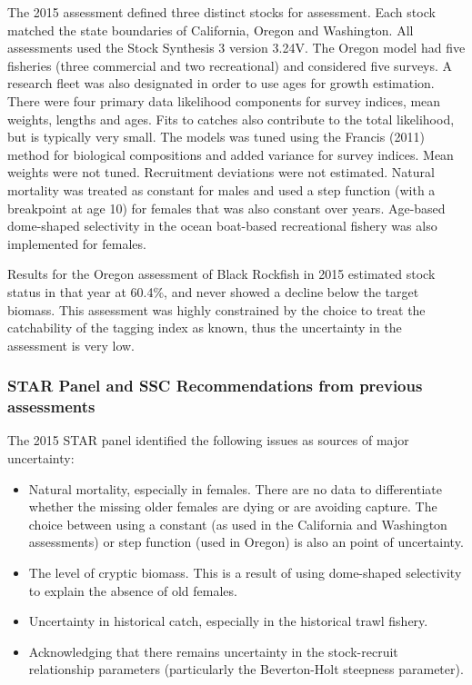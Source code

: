 \documentclass[11pt,
  letterpaper,
]{article}
\providecommand{\tightlist}{%
  \setlength{\itemsep}{0pt}\setlength{\parskip}{0pt}}
\providecommand{\tightlist}{%
  \setlength{\itemsep}{0pt}\setlength{\parskip}{0pt}}
\begin{document}
The 2015 assessment defined three distinct stocks for assessment. Each stock matched the state boundaries of California, Oregon and Washington. All assessments used the Stock Synthesis 3 version 3.24V. The Oregon model had five fisheries (three commercial and two recreational) and considered five surveys. A research fleet was also designated in order to use ages for growth estimation. There were four primary data likelihood components for survey indices, mean weights, lengths and ages. Fits to catches also contribute to the total likelihood, but is typically very small. The models was tuned using the Francis (2011) method for biological compositions and added variance for survey indices. Mean weights were not tuned. Recruitment deviations were not estimated. Natural mortality was treated as constant for males and used a step function (with a breakpoint at age 10) for females that was also constant over years. Age-based dome-shaped selectivity in the ocean boat-based recreational fishery was also implemented for females.

Results for the Oregon assessment of Black Rockfish in 2015 estimated stock status in that year at 60.4\%, and never showed a decline below the target biomass. This assessment was highly constrained by the choice to treat the catchability of the tagging index as known, thus the uncertainty in the assessment is very low.

\hypertarget{star-panel-and-ssc-recommendations-from-previous-assessments}{%
\subsubsection{STAR Panel and SSC Recommendations from previous assessments}\label{star-panel-and-ssc-recommendations-from-previous-assessments}}

The 2015 STAR panel identified the following issues as sources of major uncertainty:

\begin{itemize}
\tightlist
\item
  Natural mortality, especially in females. There are no data to differentiate whether the missing older females are dying or are avoiding capture. The choice between using a constant (as used in the California and Washington assessments) or step function (used in Oregon) is also an point of uncertainty.
\item
  The level of cryptic biomass. This is a result of using dome-shaped selectivity to explain the absence of old females.
\item
  Uncertainty in historical catch, especially in the historical trawl fishery.
\item
  Acknowledging that there remains uncertainty in the stock-recruit relationship parameters (particularly the Beverton-Holt steepness parameter).
\end{itemize}
\end{document}
